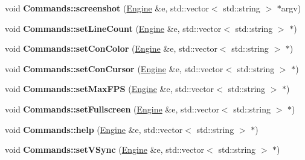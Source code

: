 \begin{DoxyCompactItemize}
\item 
void {\bfseries Commands\+::screenshot} (\hyperlink{classEngine}{Engine} \&e, std\+::vector$<$ std\+::string $>$ $\ast$argv)\hypertarget{Commands_8hh_aa9cc2524a0648b744eedcb0714d89002}{}\label{Commands_8hh_aa9cc2524a0648b744eedcb0714d89002}

\item 
void {\bfseries Commands\+::set\+Line\+Count} (\hyperlink{classEngine}{Engine} \&e, std\+::vector$<$ std\+::string $>$ $\ast$)\hypertarget{Commands_8hh_a4bbf986e8df887b1eff58b289b1de43c}{}\label{Commands_8hh_a4bbf986e8df887b1eff58b289b1de43c}

\item 
void {\bfseries Commands\+::set\+Con\+Color} (\hyperlink{classEngine}{Engine} \&e, std\+::vector$<$ std\+::string $>$ $\ast$)\hypertarget{Commands_8hh_a555ae35c352b88fabdfc5626330ec99c}{}\label{Commands_8hh_a555ae35c352b88fabdfc5626330ec99c}

\item 
void {\bfseries Commands\+::set\+Con\+Cursor} (\hyperlink{classEngine}{Engine} \&e, std\+::vector$<$ std\+::string $>$ $\ast$)\hypertarget{Commands_8hh_a4794ec0d1c5f50648a2a402385d7a5f8}{}\label{Commands_8hh_a4794ec0d1c5f50648a2a402385d7a5f8}

\item 
void {\bfseries Commands\+::set\+Max\+F\+PS} (\hyperlink{classEngine}{Engine} \&e, std\+::vector$<$ std\+::string $>$ $\ast$)\hypertarget{Commands_8hh_a7255de2b4d70815909af4fe083683d25}{}\label{Commands_8hh_a7255de2b4d70815909af4fe083683d25}

\item 
void {\bfseries Commands\+::set\+Fullscreen} (\hyperlink{classEngine}{Engine} \&e, std\+::vector$<$ std\+::string $>$ $\ast$)\hypertarget{Commands_8hh_a95557710844e794e112337d7d6f7cdff}{}\label{Commands_8hh_a95557710844e794e112337d7d6f7cdff}

\item 
void {\bfseries Commands\+::help} (\hyperlink{classEngine}{Engine} \&e, std\+::vector$<$ std\+::string $>$ $\ast$)\hypertarget{Commands_8hh_ac172f253b5f32b4dddce8387fbc5c90f}{}\label{Commands_8hh_ac172f253b5f32b4dddce8387fbc5c90f}

\item 
void {\bfseries Commands\+::set\+V\+Sync} (\hyperlink{classEngine}{Engine} \&e, std\+::vector$<$ std\+::string $>$ $\ast$)\hypertarget{Commands_8hh_a403664e9d64fa9f76ae4e09d37dc86cd}{}\label{Commands_8hh_a403664e9d64fa9f76ae4e09d37dc86cd}


\end{DoxyCompactItemize}
